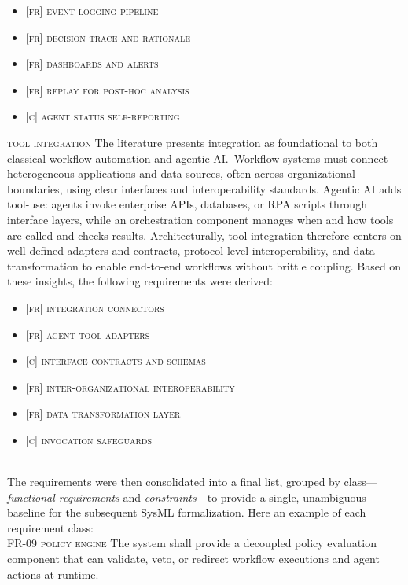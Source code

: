 \begin{itemize}
  \item \textsc{[fr] event logging pipeline}
  \item \textsc{[fr] decision trace and rationale}
  \item \textsc{[fr] dashboards and alerts}
  \item \textsc{[fr] replay for post-hoc analysis}
  \item \textsc{[c] agent status self-reporting}
\end{itemize}

\noindent \textsc{tool integration} \quad The literature presents integration as foundational to both classical workflow automation and agentic AI.~Workflow systems must connect heterogeneous applications and data sources, often across organizational boundaries, using clear interfaces and interoperability standards. Agentic AI adds tool-use: agents invoke enterprise APIs, databases, or RPA scripts through interface layers, while an orchestration component manages when and how tools are called and checks results. Architecturally, tool integration therefore centers on well-defined adapters and contracts, protocol-level interoperability, and data transformation to enable end-to-end workflows without brittle coupling. Based on these insights, the following requirements were derived:

\begin{itemize}
  \item \textsc{[fr] integration connectors}
  \item \textsc{[fr] agent tool adapters}
  \item \textsc{[c] interface contracts and schemas}
  \item \textsc{[fr] inter-organizational interoperability}
  \item \textsc{[fr] data transformation layer}
  \item \textsc{[c] invocation safeguards}
\end{itemize} \\

The requirements were then consolidated into a final list, grouped by class---\emph{functional requirements} and \emph{constraints}---to provide a single, unambiguous baseline for the subsequent SysML formalization. Here an example of each requirement class: \\

\noindent \textsc{FR-09 policy engine} \quad The system shall provide a decoupled policy evaluation component that can validate, veto, or redirect workflow executions and agent actions at runtime. \\

